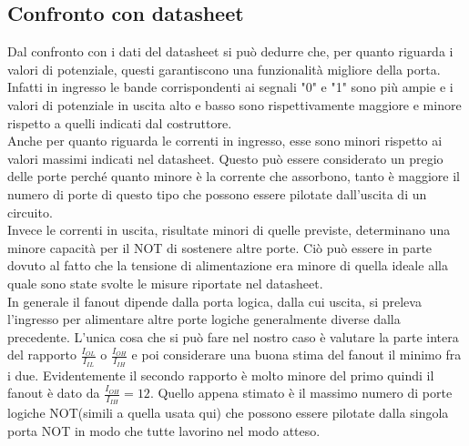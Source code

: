 \subsection{Confronto con datasheet}
Dal confronto con i dati del datasheet si può dedurre che, per quanto riguarda i valori di potenziale, questi garantiscono una funzionalità migliore della porta. Infatti in ingresso le bande corrispondenti ai segnali "0" e "1" sono più ampie e i valori di potenziale in uscita alto e basso sono rispettivamente maggiore e minore rispetto a quelli indicati dal costruttore.\\
Anche per quanto riguarda le correnti in ingresso, esse sono minori rispetto ai valori massimi indicati nel datasheet. Questo può essere considerato un pregio delle porte perché quanto minore è la corrente che assorbono, tanto è maggiore il numero di porte di questo tipo che possono essere pilotate dall'uscita di un circuito.\\
Invece le correnti in uscita, risultate minori di quelle previste, determinano una minore capacità per il NOT di sostenere altre porte. Ciò può essere in parte dovuto al fatto che la tensione di alimentazione era minore di quella ideale alla quale sono state svolte le misure riportate nel datasheet.\\
In generale il fanout dipende dalla porta logica, dalla cui uscita, si preleva l'ingresso per alimentare altre porte logiche generalmente diverse dalla precedente. L'unica cosa che si può fare nel nostro caso è valutare la parte intera del rapporto $\frac{I_{OL}}{I_{IL}}$ o  $\frac{I_{OH}}{I_{IH}}$ e poi considerare una buona stima del fanout il minimo fra i due. Evidentemente il secondo rapporto è molto minore del primo quindi il fanout è dato da $\frac{I_{OH}}{I_{IH}}= 12$. Quello appena stimato è il massimo numero di porte logiche NOT(simili a quella usata qui) che possono essere pilotate dalla singola porta NOT in modo che tutte lavorino nel modo atteso.  